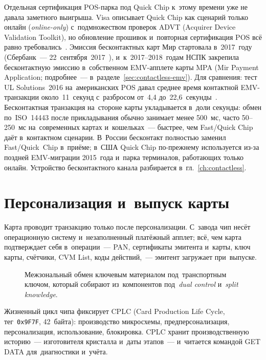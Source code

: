 Отдельная сертификация POS-парка под Quick Chip к~этому времени уже не давала
заметного выигрыша. Visa описывает Quick Chip как сценарий только онлайн
(\textit{online-only}) с~подмножеством проверок ADVT (Acquirer Device Validation Toolkit), но
обновление прошивок и~повторная сертификация POS всё равно
требовались~\cite{visa-quick-chip-emv-qvsdc}. Эмиссия бесконтактных карт Мир
стартовала в~2017~году (Сбербанк~--- 22~сентября~2017~\cite{ria-sber-contactless-2017}), и~к~2017--2018~годам
НСПК закрепила бесконтактную эмиссию в~собственном EMV-апплете карты MPA (Mir
Payment Application; подробнее~--- в~разделе~\ref{sec:contactless-emv}). Для
сравнения: тест UL Solutions~2016 на~американских POS давал среднее время
контактной EMV-транзакции около~11~секунд с~разбросом от~4{,}4
до~22{,}6~секунды~\cite{ul-emv-pos-2016}. Бесконтактная транзакция на~стороне
карты укладывается в~доли секунды: обмен по~ISO~14443 после прикладывания
обычно занимает менее 500~мс, часто 50--250~мс на~современных картах
и~кошельках~--- быстрее, чем Fast/Quick Chip даёт в~контактном сценарии.
В~России бесконтакт полностью заменил Fast/Quick~Chip в~приёме; в~США Quick
Chip по-прежнему используется из-за поздней EMV-миграции 2015~года
и~парка терминалов, работающих только онлайн.
Устройство бесконтактного канала разбирается в~гл.~\ref{ch:contactless}.

\section{Персонализация и~выпуск карты}\label{sec:emv-personalization}

Карта проводит транзакцию только после персонализации. С~завода чип несёт
операционную систему и~незаполненный платёжный апплет; всё, чем карта
подтверждает себя в~операции~--- PAN, сертификаты эмитента и~карты, ключ карты,
счётчики, CVM List, коды действий,~--- эмитент загружает при~выпуске.

\begin{figure}[!ht]
  \centering
  \caption{Межзональный обмен ключевым материалом под~транспортным ключом, который собирают из~компонентов под~\textit{dual control} и~\textit{split knowledge}.}\label{fig:card-personalization-flow}
\end{figure}

Жизненный цикл чипа фиксирует CPLC (Card Production Life Cycle,
тег~\texttt{0x9F7F}, 42~байта): производство микросхемы, предперсонализация,
персонализация, использование, блокировка. CPLC хранит производственную
историю~--- изготовителя кристалла и~даты этапов~--- и~читается командой
GET DATA для~диагностики и~учёта.

